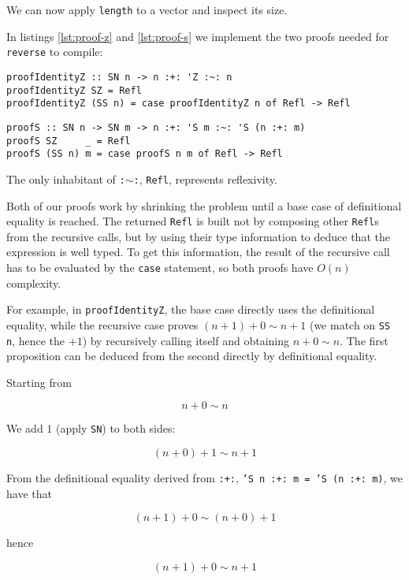 We can now apply \texttt{length} to a vector and inspect its size.

In listings \ref{lst:proof-z} and \ref{lst:proof-s} we implement the two proofs needed for \texttt{reverse} to compile:

\begin{lstlisting}[caption=A proof that \texttt{'Z} is the right identity element in type-level addition, label=lst:proof-z]
proofIdentityZ :: SN n -> n :+: 'Z :~: n
proofIdentityZ SZ = Refl
proofIdentityZ (SS n) = case proofIdentityZ n of Refl -> Refl
\end{lstlisting}

\begin{lstlisting}[caption=A proof that $n+(m+1) \sim (n+m)+1$, label=lst:proof-s]
proofS :: SN n -> SN m -> n :+: 'S m :~: 'S (n :+: m)
proofS SZ     _ = Refl
proofS (SS n) m = case proofS n m of Refl -> Refl
\end{lstlisting}

The only inhabitant of \texttt{:$\sim$:}, \texttt{Refl}, represents reflexivity.

Both of our proofs work by shrinking the problem until a base case of definitional equality is reached.
The returned \texttt{Refl} is built not by composing other \texttt{Refl}s from the recursive calls, but by using their type information to deduce that the expression is well typed.
To get this information, the result of the recursive call has to be evaluated by the \texttt{case} statement, so both proofs have $O(n)$ complexity.

For example, in \texttt{proofIdentityZ}, the base case directly uses the definitional equality, while the recursive case proves $(n+1) + 0 \sim n+1$ (we match on \texttt{SS n}, hence the $+1$) by recursively calling itself and obtaining $n+0 \sim n$.
The first proposition can be deduced from the second directly by definitional equality.

Starting from

$$
n+0 \sim n
$$

We add $1$ (apply \texttt{SN}) to both sides:

$$
(n+0)+1 \sim n+1
$$

From the definitional equality derived from \texttt{:+:}, \texttt{'S n :+: m = 'S (n :+: m)}, we have that

$$
(n+1)+0 \sim (n+0)+1
$$

hence

$$
(n+1) + 0 \sim n+1
$$

\fbox{\phantom{\rule{.7ex}{.7ex}}} \\ %

